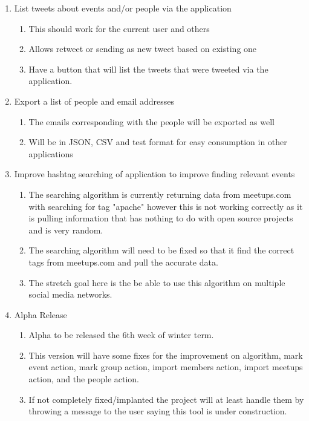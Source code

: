 \documentclass[draftclsnofoot,10pt,onecolumn]{IEEEtran} %
\begin{document}
\begin{enumerate}
\item List tweets about events and/or people via the application
\begin{enumerate}
\item This should work for the current user and others
\item Allows retweet or sending as new tweet based on existing one
\item Have a button that will list the tweets that were tweeted via the application.
\end{enumerate}

\item Export a list of people and email addresses
\begin{enumerate}
\item The emails corresponding with the people will be exported as well
\item Will be in JSON, CSV and test format for easy consumption in other applications
\end{enumerate}

\item Improve hashtag searching of application to improve finding relevant events
\begin{enumerate}
\item The searching algorithm is currently returning data from meetups.com with searching for tag "apache" however this is not working correctly as it is pulling information that has nothing to do with open source projects and is very random.
\item The searching algorithm will need to be fixed so that it find the correct tags from meetups.com and pull the accurate data.
\item The stretch goal here is the be able to use this algorithm on multiple social media networks.
\end{enumerate}

\item Alpha Release
\begin{enumerate}
\item Alpha to be released the 6th week of winter term.
\item This version will have some fixes for the improvement on algorithm, mark event action, mark group action, import members action, import meetups action, and the people action.
\item If not completely fixed/implanted the project will at least handle them by throwing a message to the user saying this tool is under construction.
\end{enumerate}


\end{enumerate}
\end{document}
